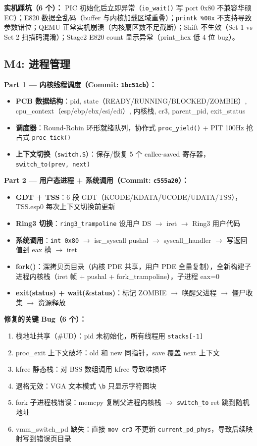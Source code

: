\documentclass[12pt,a4paper]{article}
\begin{document}
\textbf{实机踩坑（6 个）：} PIC 初始化后立即异常（\texttt{io\_wait()} 写 port 0x80 不兼容华硕 EC）；E820 数据全乱码（buffer 与内核加载区域重叠）；\texttt{printk \%08x} 不支持导致参数错位；QEMU 正常实机崩溃（内核扇区数不足截断）；Shift 不生效（Set 1 vs Set 2 扫描码混淆）；Stage2 E820 count 显示异常（print\_hex 低 4 位 bug）。

\subsection{M4: 进程管理}

\textbf{Part 1 --- 内核线程调度（Commit: \texttt{1bc51cb}）：}
\begin{itemize}
    \item \textbf{PCB 数据结构}：pid, state（READY/RUNNING/BLOCKED/ZOMBIE）, cpu\_context（esp/ebp/ebx/esi/edi）, 内核栈, cr3, parent\_pid, exit\_status
    \item \textbf{调度器}：Round-Robin 环形就绪队列，协作式 \texttt{proc\_yield()} + PIT 100Hz 抢占式 \texttt{proc\_tick()}
    \item \textbf{上下文切换}（\texttt{switch.S}）：保存/恢复 5 个 callee-saved 寄存器，\texttt{switch\_to(prev, next)}
\end{itemize}

\textbf{Part 2 --- 用户态进程 + 系统调用（Commit: \texttt{c555a20}）：}
\begin{itemize}
    \item \textbf{GDT + TSS}：6 段 GDT（KCODE/KDATA/UCODE/UDATA/TSS），TSS.esp0 每次上下文切换前更新
    \item \textbf{Ring3 切换}：\texttt{ring3\_trampoline} 设用户 DS $\to$ iret $\to$ Ring3 用户代码
    \item \textbf{系统调用}：\texttt{int 0x80} $\to$ isr\_syscall pushal $\to$ syscall\_handler $\to$ 写返回值到 eax 槽 $\to$ iret
    \item \textbf{fork()}：深拷贝页目录（内核 PDE 共享，用户 PDE 全量复制），全新构建子进程内核栈（iret 帧 + pushal + fork\_trampoline），子进程 eax=0
    \item \textbf{exit(status) + wait(\&status)}：标记 ZOMBIE $\to$ 唤醒父进程 $\to$ 僵尸收集 $\to$ 资源释放
\end{itemize}

\textbf{修复的关键 Bug（6 个）：}
\begin{enumerate}
    \item 栈地址共享（\#UD）：pid 未初始化，所有线程用 \texttt{stacks[-1]}
    \item proc\_exit 上下文破坏：old 和 new 同指针，save 覆盖 next 上下文
    \item kfree 静态栈：对 BSS 数组调用 kfree 导致堆损坏
    \item 退格无效：VGA 文本模式 \texttt{\textbackslash b} 只显示字符图块
    \item fork 子进程栈错误：memcpy 复制父进程内核栈 $\to$ \texttt{switch\_to} ret 跳到随机地址
    \item vmm\_switch\_pd 缺失：直接 \texttt{mov cr3} 不更新 \texttt{current\_pd\_phys}，导致后续映射写到错误页目录
\end{enumerate}
\end{document}
